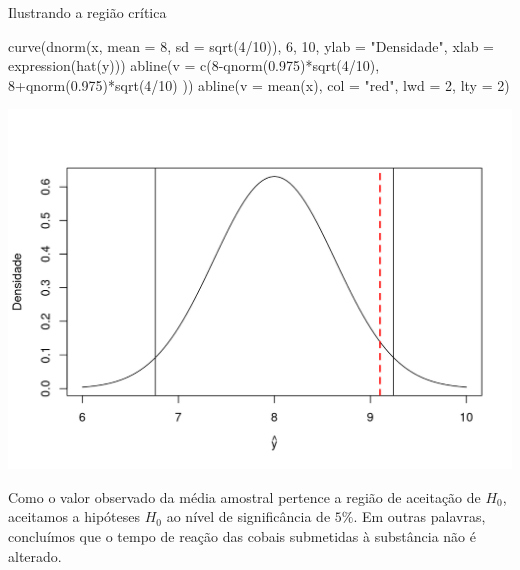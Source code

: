 \documentclass[
  10pt,
  a4paper]{book}
\newenvironment{Shaded}{\begin{snugshade}}{\end{snugshade}}
\newcommand{\AttributeTok}[1]{\textcolor[rgb]{0.77,0.63,0.00}{#1}}
\newcommand{\DecValTok}[1]{\textcolor[rgb]{0.00,0.00,0.81}{#1}}
\newcommand{\FloatTok}[1]{\textcolor[rgb]{0.00,0.00,0.81}{#1}}
\newcommand{\FunctionTok}[1]{\textcolor[rgb]{0.00,0.00,0.00}{#1}}
\newcommand{\NormalTok}[1]{#1}
\newcommand{\SpecialCharTok}[1]{\textcolor[rgb]{0.00,0.00,0.00}{#1}}
\newcommand{\StringTok}[1]{\textcolor[rgb]{0.31,0.60,0.02}{#1}}
\begin{document}
Ilustrando a região crítica

\begin{Shaded}
\begin{Highlighting}[]
\FunctionTok{curve}\NormalTok{(}\FunctionTok{dnorm}\NormalTok{(x, }\AttributeTok{mean =} \DecValTok{8}\NormalTok{, }\AttributeTok{sd =} \FunctionTok{sqrt}\NormalTok{(}\DecValTok{4}\SpecialCharTok{/}\DecValTok{10}\NormalTok{)), }\DecValTok{6}\NormalTok{, }\DecValTok{10}\NormalTok{, }
      \AttributeTok{ylab =} \StringTok{"Densidade"}\NormalTok{, }\AttributeTok{xlab =} \FunctionTok{expression}\NormalTok{(}\FunctionTok{hat}\NormalTok{(y)))}
\FunctionTok{abline}\NormalTok{(}\AttributeTok{v =} \FunctionTok{c}\NormalTok{(}\DecValTok{8}\SpecialCharTok{{-}}\FunctionTok{qnorm}\NormalTok{(}\FloatTok{0.975}\NormalTok{)}\SpecialCharTok{*}\FunctionTok{sqrt}\NormalTok{(}\DecValTok{4}\SpecialCharTok{/}\DecValTok{10}\NormalTok{), }\DecValTok{8}\SpecialCharTok{+}\FunctionTok{qnorm}\NormalTok{(}\FloatTok{0.975}\NormalTok{)}\SpecialCharTok{*}\FunctionTok{sqrt}\NormalTok{(}\DecValTok{4}\SpecialCharTok{/}\DecValTok{10}\NormalTok{) ))}
\FunctionTok{abline}\NormalTok{(}\AttributeTok{v =} \FunctionTok{mean}\NormalTok{(x), }\AttributeTok{col =} \StringTok{"red"}\NormalTok{, }\AttributeTok{lwd =} \DecValTok{2}\NormalTok{, }\AttributeTok{lty =} \DecValTok{2}\NormalTok{)}
\end{Highlighting}
\end{Shaded}

\begin{center}\includegraphics{figures/unnamed-chunk-394-1} \end{center}

Como o valor observado da média amostral pertence a região de aceitação de \(H_0\), aceitamos a hipóteses \(H_0\) ao nível de significância de \(5\%\). Em outras palavras, concluímos que o tempo de reação das cobais submetidas à substância não é alterado.
\end{document}
